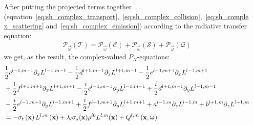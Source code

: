 After putting the projected terms together (equation~\ref{eq:sh_complex_transport},~\ref{eq:sh_complex_collision},~\ref{eq:sh_complex_scattering} and~\ref{eq:sh_complex_emission}) according to the radiative transfer equation:
\begin{align}
\mathcal{P}_{\vec{\omega}}\left(\mathcal{T}\right) = \mathcal{P}_{\vec{\omega}}\left(\mathcal{C}\right) + \mathcal{P}_{\vec{\omega}}\left(\mathcal{S}\right) + \mathcal{P}_{\vec{\omega}}\left(\mathcal{Q}\right)
\end{align}
we get, as the result, the complex-valued $P_N$-equations:
\begin{align}
&
\frac{1}{2}c^{l-1, m-1}\partial_x L^{l-1,m-1}
-\frac{1}{2}d^{l+1, m-1}\partial_x L^{l+1,m-1}
-\frac{1}{2}e^{l-1, m+1}\partial_x L^{l-1,m+1}
\nonumber
\\
&
+\frac{1}{2}f^{l+1, m+1}\partial_x L^{l+1,m+1}
-\frac{i}{2}c^{l-1, m-1}\partial_y L^{l-1,m-1}
+\frac{i}{2}d^{l+1, m-1}\partial_y L^{l+1,m-1}
\nonumber
\\
&
-\frac{i}{2}e^{l-1, m+1}\partial_y L^{l-1,m+1}
+\frac{i}{2}f^{l+1, m+1}\partial_y L^{l+1,m+1}
+a^{l-1, m}\partial_z L^{l-1,m}
+b^{l+1, m}\partial_z L^{l+1,m}
\nonumber
\\
&
=
-\sigma_t\left(\boldsymbol{\mathbf{x}}\right)L^{l,m}\left(\boldsymbol{\mathbf{x}}\right )
+
\lambda_l
\sigma_s(\boldsymbol{\mathbf{x}})
\rho^{l0}L^{l,m}(\boldsymbol{\mathbf{x}}) + Q^{l,m}\left(\boldsymbol{\mathbf{x}}, \boldsymbol{\mathbf{\omega}}\right)
\label{eq:sh_pne_complex}
\end{align}